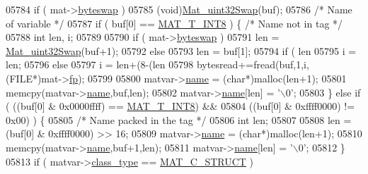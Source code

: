 \begin{DoxyCode}
{{{{{{{{{{{{{{{{{{{{{{{{{{{{{{{{{{{05784             \textcolor{keywordflow}{if} ( mat->\hyperlink{struct__mat__t_a99d207977af5e04941ace56d71817a40}{byteswap} )
05785                 (void)\hyperlink{endian_8c_a8cb0d0750e2eaf9840d95db531934f4f}{Mat\_uint32Swap}(buf);
05786             \textcolor{comment}{/* Name of variable */}
05787             \textcolor{keywordflow}{if} ( buf[0] == \hyperlink{group___m_a_t_ggacf7b3b879282b7ab3a51190e49bf3453a9807f5033ed4f9b548953742d9fd1658}{MAT\_T\_INT8} ) \{    \textcolor{comment}{/* Name not in tag */}
05788                 \textcolor{keywordtype}{int} len, i;
05789 
05790                 \textcolor{keywordflow}{if} ( mat->\hyperlink{struct__mat__t_a99d207977af5e04941ace56d71817a40}{byteswap} )
05791                     len = \hyperlink{endian_8c_a8cb0d0750e2eaf9840d95db531934f4f}{Mat\_uint32Swap}(buf+1);
05792                 \textcolor{keywordflow}{else}
05793                     len = buf[1];
05794                 \textcolor{keywordflow}{if} ( len %
05795                     i = len;
05796                 \textcolor{keywordflow}{else}
05797                     i = len+(8-(len %
05798                 bytesread+=fread(buf,1,i,(FILE*)mat->\hyperlink{struct__mat__t_a85f562e407ca9ad4d2a6e14f839432b7}{fp});
05799 
05800                 matvar->\hyperlink{group___m_a_t_a5d4b55b041e3b4fb50c04337f05ad909}{name} = (\textcolor{keywordtype}{char}*)malloc(len+1);
05801                 memcpy(matvar->\hyperlink{group___m_a_t_a5d4b55b041e3b4fb50c04337f05ad909}{name},buf,len);
05802                 matvar->\hyperlink{group___m_a_t_a5d4b55b041e3b4fb50c04337f05ad909}{name}[len] = \textcolor{charliteral}{'\(\backslash\)0'};
05803             \} \textcolor{keywordflow}{else} \textcolor{keywordflow}{if} ( ((buf[0] & 0x0000ffff) == \hyperlink{group___m_a_t_ggacf7b3b879282b7ab3a51190e49bf3453a9807f5033ed4f9b548953742d9fd1658}{MAT\_T\_INT8}) &&
05804                         ((buf[0] & 0xffff0000) != 0x00) ) \{
05805                 \textcolor{comment}{/* Name packed in the tag */}
05806                 \textcolor{keywordtype}{int} len;
05807 
05808                 len = (buf[0] & 0xffff0000) >> 16;
05809                 matvar->\hyperlink{group___m_a_t_a5d4b55b041e3b4fb50c04337f05ad909}{name} = (\textcolor{keywordtype}{char}*)malloc(len+1);
05810                 memcpy(matvar->\hyperlink{group___m_a_t_a5d4b55b041e3b4fb50c04337f05ad909}{name},buf+1,len);
05811                 matvar->\hyperlink{group___m_a_t_a5d4b55b041e3b4fb50c04337f05ad909}{name}[len] = \textcolor{charliteral}{'\(\backslash\)0'};
05812             \}
05813             \textcolor{keywordflow}{if} ( matvar->\hyperlink{group___m_a_t_aff13035bf3265dd7d9425e5d40c839d4}{class\_type} == \hyperlink{group___m_a_t_ggad4d60ae7b709fc81bfd744fb4c857c40acb467c7749c80902b798134c729bb521}{MAT\_C\_STRUCT} )
}}}}}}}}}}}}}}}}}}}}}}}}}}}}}}}}}}}
\end{DoxyCode}
